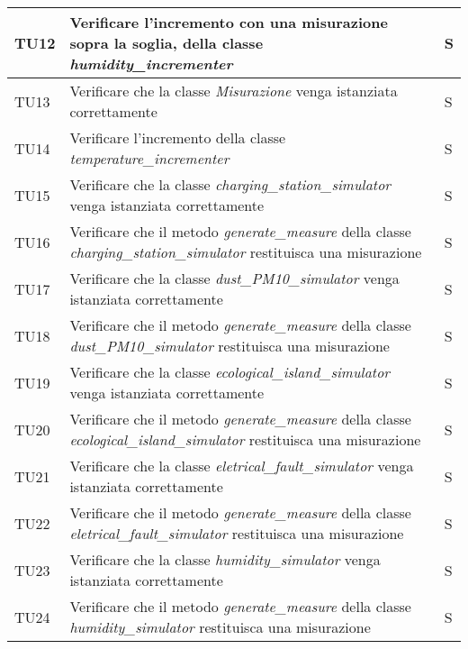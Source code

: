 \begin{longtable}{|C{1.9cm}|L{5.5cm}|C{2cm}|}
    TU12 & Verificare l'incremento con una misurazione sopra la soglia,  della classe \textit{humidity\_incrementer} & S \\
    \hline

    TU13 & Verificare che la classe \textit{Misurazione} venga istanziata correttamente & S \\
    \hline

    TU14 & Verificare l'incremento della classe \textit{temperature\_incrementer} & S \\
    \hline

    TU15 & Verificare che la classe \textit{charging\_station\_simulator} venga istanziata correttamente & S \\
    \hline

    TU16 & Verificare che il metodo \textit{generate\_measure} della classe \textit{charging\_station\_simulator} restituisca una misurazione & S \\
    \hline

    TU17 & Verificare che la classe \textit{dust\_PM10\_simulator} venga istanziata correttamente & S \\
    \hline

    TU18 & Verificare che il metodo \textit{generate\_measure} della classe \textit{dust\_PM10\_simulator} restituisca una misurazione & S \\
    \hline

    TU19 & Verificare che la classe \textit{ecological\_island\_simulator} venga istanziata correttamente & S \\
    \hline

    TU20 & Verificare che il metodo \textit{generate\_measure} della classe \textit{ecological\_island\_simulator} restituisca una misurazione & S \\
    \hline

    TU21 & Verificare che la classe \textit{eletrical\_fault\_simulator} venga istanziata correttamente & S \\
    \hline

    TU22 & Verificare che il metodo \textit{generate\_measure} della classe \textit{eletrical\_fault\_simulator} restituisca una misurazione & S \\
    \hline

    TU23 & Verificare che la classe \textit{humidity\_simulator} venga istanziata correttamente & S \\
    \hline

    TU24 & Verificare che il metodo \textit{generate\_measure} della classe \textit{humidity\_simulator} restituisca una misurazione & S \\
    \hline


\end{longtable}
